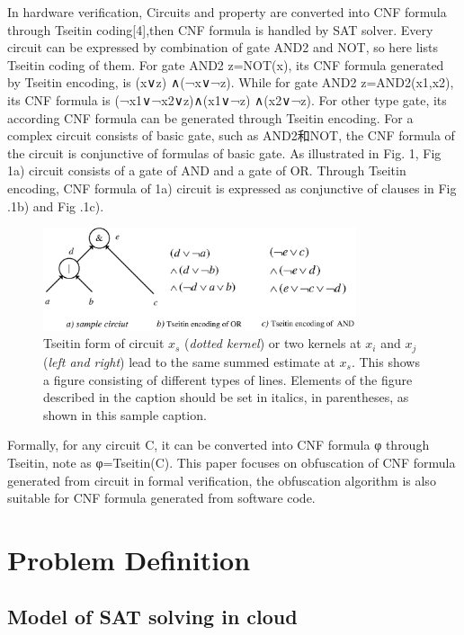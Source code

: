 \documentclass[runningheads,a4paper]{llncs}
\begin{document}
In hardware verification, Circuits and property are converted into CNF formula through Tseitin coding[4],then CNF formula is handled by SAT solver. 
Every circuit can be expressed by combination of gate AND2 and NOT, so here lists Tseitin coding of them. 
For gate AND2 z=NOT(x), its CNF formula generated by Tseitin encoding, is  (x∨z) ∧(¬x∨¬z).
While for gate AND2 z=AND2(x1,x2), its CNF formula is (¬x1∨¬x2∨z)∧(x1∨¬z) ∧(x2∨¬z).
For other type gate, its according CNF formula can be generated through Tseitin encoding.
For a complex circuit consists of basic gate, such as AND2和NOT, the CNF formula of the circuit is conjunctive of formulas of basic gate.
As illustrated in Fig. 1, Fig 1a) circuit consists of a gate of AND and a gate of OR. Through Tseitin encoding, CNF formula of 1a) circuit  is expressed as conjunctive of clauses in Fig .1b) and Fig .1c).
\begin{figure}
\centering
\includegraphics[width=9.2cm]{a1}
\caption{Tseitin form of circuit $x_s$ (\emph{dotted kernel}) or two kernels at
$x_i$ and $x_j$ (\textit{left and right}) lead to the same summed estimate
at $x_s$. This shows a figure consisting of different types of
lines. Elements of the figure described in the caption should be set in
italics, in parentheses, as shown in this sample caption.}
\label{fig:example}
\end{figure}
Formally, for any circuit C, it can be converted into CNF formula φ through Tseitin, note as φ=Tseitin(C).
This paper focuses on obfuscation of CNF formula generated from circuit in formal verification, the obfuscation algorithm is also suitable for CNF formula generated from software code.

\section{Problem Definition}

\subsection{Model of SAT solving in cloud}
\end{document}
